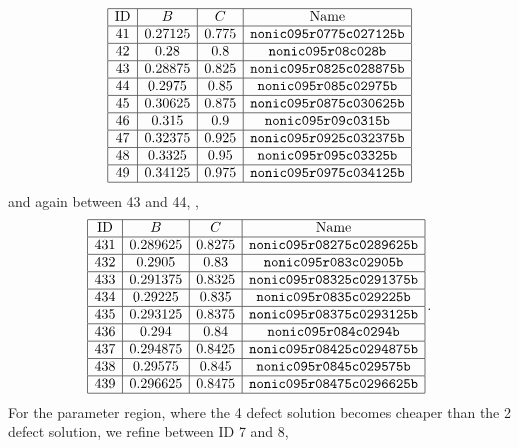 \documentclass[a4paper,11pt]{scrartcl}
\newcommand{\pstretch}{C}
\newcommand{\ppress}{B}
\begin{document}
\begin{align}
  \begin{array}{|c|c|c|c|}
    \hline
    \text{ID} & \ppress & \pstretch & \text{Name}\\\hline
41 & 0.27125 & 0.775 & \texttt{nonic095r0775c027125b} \\\hline
42 & 0.28 & 0.8 & \texttt{nonic095r08c028b} \\\hline
43 & 0.28875 & 0.825 & \texttt{nonic095r0825c028875b} \\\hline
44 & 0.2975 & 0.85 & \texttt{nonic095r085c02975b} \\\hline
45 & 0.30625 & 0.875 & \texttt{nonic095r0875c030625b} \\\hline
46 & 0.315 & 0.9 & \texttt{nonic095r09c0315b} \\\hline
47 & 0.32375 & 0.925 & \texttt{nonic095r0925c032375b} \\\hline
48 & 0.3325 & 0.95 & \texttt{nonic095r095c03325b} \\\hline
49 & 0.34125 & 0.975 & \texttt{nonic095r0975c034125b} \\\hline
  \end{array}
\end{align}
and again between 43 and 44, \ie,
\begin{align}
  \begin{array}{|c|c|c|c|}
    \hline
    \text{ID} & \ppress & \pstretch & \text{Name}\\\hline
431 & 0.289625 & 0.8275 & \texttt{nonic095r08275c0289625b} \\\hline
432 & 0.2905 & 0.83 & \texttt{nonic095r083c02905b} \\\hline
433 & 0.291375 & 0.8325 & \texttt{nonic095r08325c0291375b} \\\hline
434 & 0.29225 & 0.835 & \texttt{nonic095r0835c029225b} \\\hline
435 & 0.293125 & 0.8375 & \texttt{nonic095r08375c0293125b} \\\hline
436 & 0.294 & 0.84 & \texttt{nonic095r084c0294b} \\\hline
437 & 0.294875 & 0.8425 & \texttt{nonic095r08425c0294875b} \\\hline
438 & 0.29575 & 0.845 & \texttt{nonic095r0845c029575b} \\\hline
439 & 0.296625 & 0.8475 & \texttt{nonic095r08475c0296625b} \\\hline
  \end{array} \formPeriod
\end{align}
For the parameter region, where the 4 defect solution becomes cheaper than the 2 defect solution, we refine between ID 7 and 8,
\end{document}
